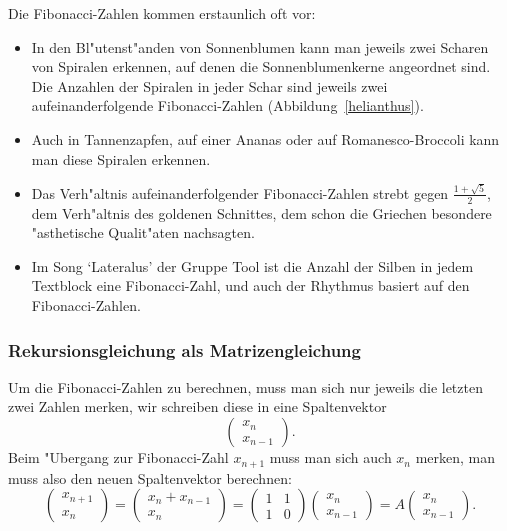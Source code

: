 Die Fibonacci-Zahlen kommen erstaunlich oft vor:
\begin{itemize}
\item In den Bl"utenst"anden von Sonnenblumen kann man jeweils zwei
Scharen von Spiralen erkennen, auf denen die Sonnenblumenkerne angeordnet sind.
Die Anzahlen der Spiralen in jeder Schar sind jeweils zwei aufeinanderfolgende
Fibonacci-Zahlen (Abbildung~\ref{helianthus}).
\item Auch in Tannenzapfen, auf einer Ananas oder auf Romanesco-Broccoli
kann man diese Spiralen erkennen.
\item Das Verh"altnis aufeinanderfolgender Fibonacci-Zahlen strebt gegen
$\frac{1+\sqrt{5}}2$, dem Verh"altnis des goldenen Schnittes, dem schon die
Griechen besondere "asthetische Qualit"aten nachsagten.
\item Im Song `Lateralus' der Gruppe Tool ist die Anzahl der Silben
in jedem Textblock eine Fibonacci-Zahl, und auch der Rhythmus basiert
auf den Fibonacci-Zahlen.
\end{itemize}

\subsubsection{Rekursionsgleichung als Matrizengleichung}
Um die Fibonacci-Zahlen zu berechnen, muss man sich nur jeweils die letzten zwei
Zahlen merken, wir schreiben diese in eine Spaltenvektor
\[
\begin{pmatrix}x_n\\x_{n-1}\end{pmatrix}.
\]
Beim "Ubergang zur Fibonacci-Zahl $x_{n+1}$ muss man sich auch $x_n$ merken,
man muss also den neuen Spaltenvektor berechnen:
\begin{equation}
\begin{pmatrix}x_{n+1}\\x_n\end{pmatrix}
=
\begin{pmatrix}x_n+x_{n-1}\\x_n\end{pmatrix}
=
\begin{pmatrix}
1&1\\
1&0
\end{pmatrix}
\begin{pmatrix}x_n\\x_{n-1}\end{pmatrix}
=
A
\begin{pmatrix}x_n\\x_{n-1}\end{pmatrix}.
\label{fibonaccirekursion}
\end{equation}
